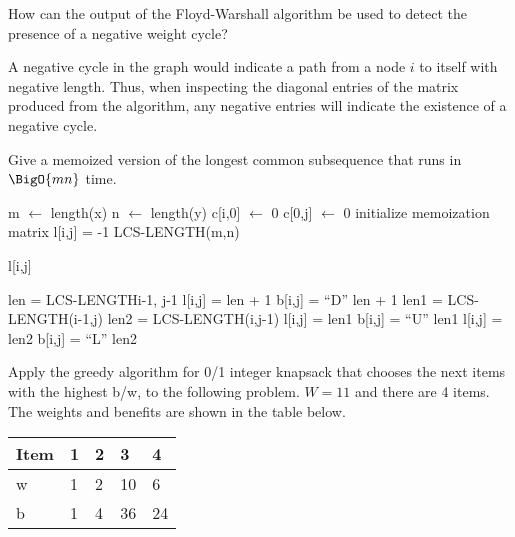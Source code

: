 \documentclass[12pt,letterpaper,twoside]{hmcpset}
\begin{document}
\begin{problem}[4]
 How can the output of the Floyd-Warshall algorithm be used to detect the presence of a negative weight cycle?
\end{problem}

\begin{solution}
A negative cycle in the graph would indicate a path from a node $i$ to itself with negative length.  Thus, when inspecting the diagonal entries of the matrix produced from the algorithm, any negative entries will indicate the existence of a negative cycle.
\end{solution}

\begin{problem}[5]
 Give a memoized version of the longest common subsequence that runs in $\BigO{mn}$ time.
\end{problem}

\begin{solution}
 \begin{algorithmic}
  \State m $\leftarrow$ length(x)
  \State n $\leftarrow$ length(y)
    \State c[i,0] $\leftarrow$ 0
  \EndFor
    \State c[0,j] $\leftarrow$ 0
  \EndFor
  \Comment initialize memoization matrix
      \State l[i,j] = -1
    \EndFor
  \EndFor
  \State\Return LCS-LENGTH(m,n)
  \EndFunction
  
    \State{}
  \EndIf
  
    \State\Return l[i,j]
  \EndIf
  
    \State len = LCS-LENGTH{i-1, j-1}
    \State l[i,j] = len + 1
    \State b[i,j] = ``D''
    \State\Return len + 1
  \Else
    \State len1 = LCS-LENGTH(i-1,j) 
    \State len2 = LCS-LENGTH(i,j-1)
      \State l[i,j] = len1
      \State b[i,j] = ``U''
      \State\Return len1
    \Else
      \State l[i,j] = len2
      \State b[i,j] = ``L''
      \State\Return len2
    \EndIf
  \EndIf
  
  \EndFunction
 \end{algorithmic}

\end{solution}

\begin{problem}[6a]
 Apply the greedy algorithm for 0/1 integer knapsack that chooses the next items with the highest b/w, to the following problem.  $W=11$ and there are 4 items.  The weights and benefits are shown in the table below.
\begin{center}
 \begin{tabular}{|l|l|l|l|l|}\hline
Item & 1 & 2 & 3 & 4\\\hline
w & 1 & 2 & 10 & 6\\\hline
b & 1 & 4 & 36 & 24\\\hline
 \end{tabular}
\end{center}


\end{problem}
\end{document}
